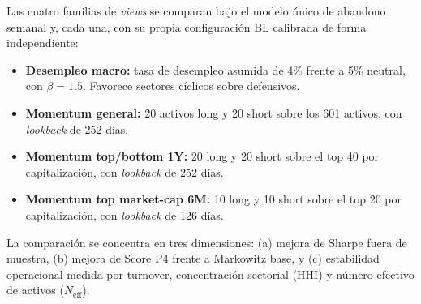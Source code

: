 Las cuatro familias de \textit{views} se comparan bajo el modelo \'unico de
abandono semanal y, cada una, con su propia configuraci\'on BL calibrada de
forma independiente:

\begin{itemize}
    \item \textbf{Desempleo macro:} tasa de desempleo asumida de 4\% frente a
    5\% neutral, con $\beta = 1.5$. Favorece sectores c\'iclicos sobre
    defensivos.

    \item \textbf{Momentum general:} 20 activos long y 20 short sobre los 601
    activos, con \textit{lookback} de 252 d\'ias.

    \item \textbf{Momentum top/bottom 1Y:} 20 long y 20 short sobre el top 40
    por capitalizaci\'on, con \textit{lookback} de 252 d\'ias.

    \item \textbf{Momentum top market-cap 6M:} 10 long y 10 short sobre el top
    20 por capitalizaci\'on, con \textit{lookback} de 126 d\'ias.
\end{itemize}

La comparaci\'on se concentra en tres dimensiones: (a) mejora de Sharpe fuera
de muestra, (b) mejora de Score P4 frente a Markowitz base, y (c) estabilidad
operacional medida por turnover, concentraci\'on sectorial (HHI) y n\'umero
efectivo de activos ($N_{\text{eff}}$).
